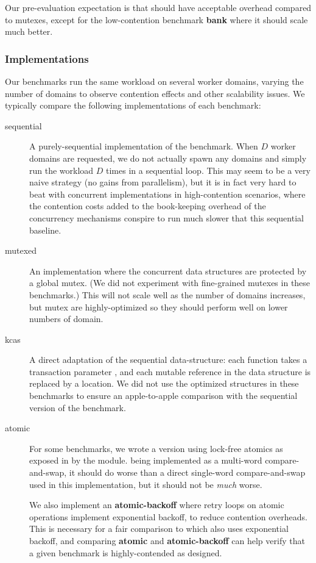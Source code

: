 Our pre-evaluation expectation is that \Kcas should have acceptable
overhead compared to mutexes, except for the low-contention benchmark
\textbf{bank} where it should scale much better.

\subsubsection{Implementations}

Our benchmarks run the same workload on several worker domains,
varying the number of domains to observe contention effects and other
scalability issues. We typically compare the following implementations
of each benchmark:

\begin{description}
\item[sequential] A purely-sequential implementation of the
  benchmark. When $D$ worker domains are requested, we do not actually
  spawn any domains and simply run the workload $D$ times in
  a sequential loop. This may seem to be a very naive strategy
  (no gains from parallelism), but it is in fact very hard to beat
  with concurrent implementations in high-contention scenarios, where
  the contention costs added to the book-keeping overhead of the
  concurrency mechanisms conspire to run much slower that this
  sequential baseline.

\item[mutexed] An implementation where the concurrent data structures
  are protected by a global mutex. (We did not experiment with
  fine-grained mutexes in these benchmarks.) This will not scale well
  as the number of domains increases, but mutex are highly-optimized
  so they should perform well on lower numbers of domain.

\item[kcas] A direct \Kcas adaptation of the sequential
  data-structure: each function takes a transaction parameter
  , and each mutable reference in the data structure is
  replaced by a \Kcas location. We did not use the optimized
  \KcasData structures in these benchmarks to ensure an
  apple-to-apple comparison with the sequential version of the
  benchmark.

\item[atomic] For some benchmarks, we wrote a version using lock-free
  atomics as exposed in \OCaml by the  module. \Kcas
  being implemented as a multi-word compare-and-swap, it should do
  worse than a direct single-word compare-and-swap used in this
  implementation, but it should not be \emph{much} worse.

  We also implement an \textbf{atomic-backoff} where retry loops on
  atomic operations implement exponential backoff, to reduce
  contention overheads. This is necessary for a fair comparison to
  \Kcas which also uses exponential backoff, and comparing
  \textbf{atomic} and \textbf{atomic-backoff} can help verify that
  a given benchmark is highly-contended as designed.
\end{description}

